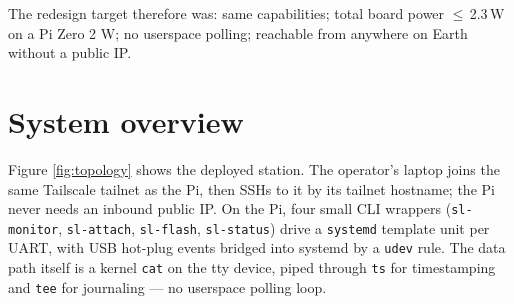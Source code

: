 \documentclass[11pt,a4paper]{article}
\begin{document}
The redesign target therefore was: same capabilities; total board
power $\leq$\,2.3\,W on a Pi Zero 2 W; no userspace polling; reachable
from anywhere on Earth without a public IP.

\section{System overview}

Figure \ref{fig:topology} shows the deployed station. The operator's
laptop joins the same Tailscale tailnet as the Pi, then SSHs to it by
its tailnet hostname; the Pi never needs an inbound public IP. On
the Pi, four small CLI wrappers (\texttt{sl-monitor}, \texttt{sl-attach},
\texttt{sl-flash}, \texttt{sl-status}) drive a \texttt{systemd}
template unit per UART, with USB hot-plug events bridged into systemd
by a \texttt{udev} rule. The data path itself is a kernel \texttt{cat}
on the tty device, piped through \texttt{ts} for timestamping and
\texttt{tee} for journaling --- no userspace polling loop.
\end{document}
